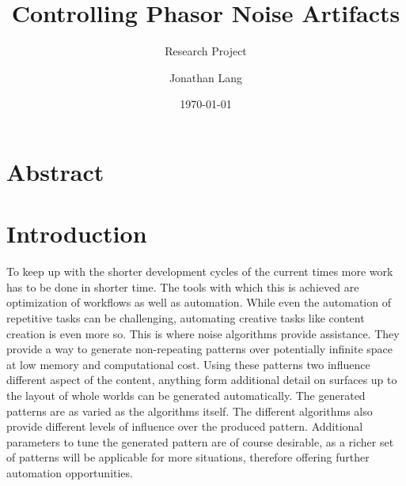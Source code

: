 \documentclass{utue} %
\title{Controlling Phasor Noise Artifacts}
\author{Jonathan Lang}
\date{\today}
\subtitle{Research Project}
\begin{document}

\maketitle 
 
\section*{Abstract}  
  
\section{Introduction}   
To keep up with the shorter development cycles of the current times more work has to be done in shorter time. The tools with which this is achieved are optimization of workflows as well as automation. While even the automation of repetitive tasks can be challenging, automating creative tasks like content creation is even more so. This is where noise algorithms provide assistance. They provide a way to generate non-repeating patterns over potentially infinite space at low memory and computational cost. Using these patterns two influence different aspect of the content, anything form additional detail on surfaces up to the layout of whole worlds can be generated automatically. The generated patterns are as varied as the algorithms itself. The different algorithms also provide different levels of influence over the produced pattern. Additional parameters to tune the generated pattern are of course desirable, as a richer set of patterns will be applicable for more situations, therefore offering further automation opportunities.
\end{document}
